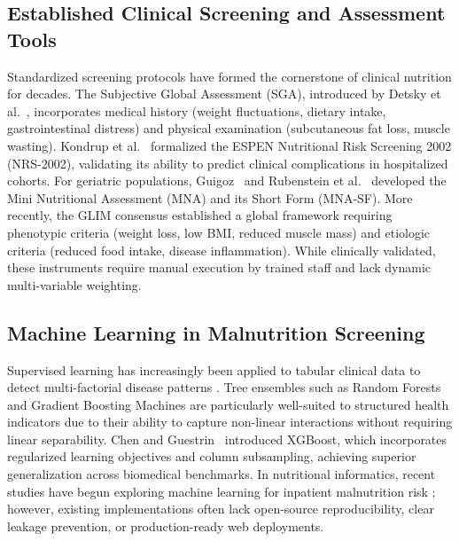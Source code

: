 \documentclass[conference]{IEEEtran}
\begin{document}
\subsection{Established Clinical Screening and Assessment Tools}
Standardized screening protocols have formed the cornerstone of clinical nutrition for decades. The Subjective Global Assessment (SGA), introduced by Detsky et al.~\cite{detsky1987what}, incorporates medical history (weight fluctuations, dietary intake, gastrointestinal distress) and physical examination (subcutaneous fat loss, muscle wasting). Kondrup et al.~\cite{kondrup2003espen} formalized the ESPEN Nutritional Risk Screening 2002 (NRS-2002), validating its ability to predict clinical complications in hospitalized cohorts. For geriatric populations, Guigoz~\cite{guigoz2006mini} and Rubenstein et al.~\cite{rubenstein2001screening} developed the Mini Nutritional Assessment (MNA) and its Short Form (MNA-SF). More recently, the GLIM consensus \cite{cederholm2019glim} established a global framework requiring phenotypic criteria (weight loss, low BMI, reduced muscle mass) and etiologic criteria (reduced food intake, disease inflammation). While clinically validated, these instruments require manual execution by trained staff and lack dynamic multi-variable weighting.

\subsection{Machine Learning in Malnutrition Screening}
Supervised learning has increasingly been applied to tabular clinical data to detect multi-factorial disease patterns \cite{rajkomar2018scalable}. Tree ensembles such as Random Forests \cite{breiman2001random} and Gradient Boosting Machines \cite{friedman2001greedy} are particularly well-suited to structured health indicators due to their ability to capture non-linear interactions without requiring linear separability. Chen and Guestrin~\cite{chen2016xgboost} introduced XGBoost, which incorporates regularized learning objectives and column subsampling, achieving superior generalization across biomedical benchmarks. In nutritional informatics, recent studies have begun exploring machine learning for inpatient malnutrition risk \cite{pedregosa2011scikit}; however, existing implementations often lack open-source reproducibility, clear leakage prevention, or production-ready web deployments.
\end{document}
